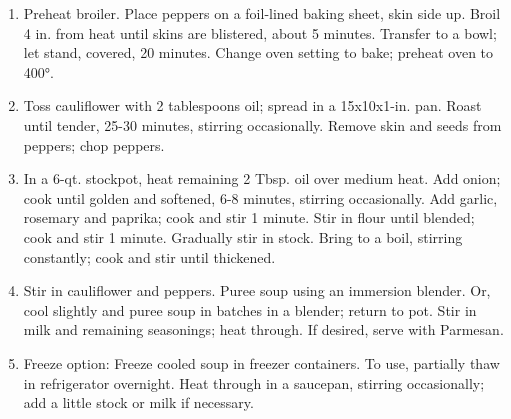 \begin{enumerate}
  \item Preheat broiler. Place peppers on a foil-lined baking sheet, skin side up. Broil 4 in. from heat until skins are blistered, about 5 minutes. Transfer to a bowl; let stand, covered, 20 minutes. Change oven setting to bake; preheat oven to 400°.
  \item Toss cauliflower with 2 tablespoons oil; spread in a 15x10x1-in. pan. Roast until tender, 25-30 minutes, stirring occasionally. Remove skin and seeds from peppers; chop peppers.
  \item In a 6-qt. stockpot, heat remaining 2 Tbsp. oil over medium heat. Add onion; cook until golden and softened, 6-8 minutes, stirring occasionally. Add garlic, rosemary and paprika; cook and stir 1 minute. Stir in flour until blended; cook and stir 1 minute. Gradually stir in stock. Bring to a boil, stirring constantly; cook and stir until thickened.
  \item Stir in cauliflower and peppers. Puree soup using an immersion blender. Or, cool slightly and puree soup in batches in a blender; return to pot. Stir in milk and remaining seasonings; heat through. If desired, serve with Parmesan.
  \item Freeze option: Freeze cooled soup in freezer containers. To use, partially thaw in refrigerator overnight. Heat through in a saucepan, stirring occasionally; add a little stock or milk if necessary.
\end{enumerate}
